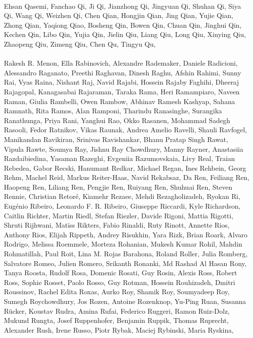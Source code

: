 \paragraph{}Ehsan Qasemi, Fanchao Qi, Ji Qi, Jianzhong Qi, Jingyuan Qi, Shuhan Qi, Siya Qi, Wang Qi, Weizhen Qi, Chen Qian, Hongjin Qian, Jing Qian, Yujie Qian, Zhong Qian, Yaqiong Qiao, Bosheng Qin, Bowen Qin, Chuan Qin, Jinghui Qin, Kechen Qin, Libo Qin, Yujia Qin, Jielin Qiu, Liang Qiu, Long Qiu, Xinying Qiu, Zhaopeng Qiu, Zimeng Qiu, Chen Qu, Tingyu Qu,
\paragraph{}Rakesh R. Menon, Ella Rabinovich, Alexandre Rademaker, Daniele Radicioni, Alessandro Raganato, Preethi Raghavan, Dinesh Raghu, Afshin Rahimi, Sunny Rai, Vyas Raina, Nishant Raj, Navid Rajabi, Hossein Rajaby Faghihi, Dheeraj Rajagopal, Kanagasabai Rajaraman, Taraka Rama, Heri Ramampiaro, Naveen Raman, Giulia Rambelli, Owen Rambow, Abhinav Ramesh Kashyap, Sahana Ramnath, Rita Ramos, Alan Ramponi, Tharindu Ranasinghe, Surangika Ranathunga, Priya Rani, Yanghui Rao, Okko Rasanen, Mohammad Sadegh Rasooli, Fedor Ratnikov, Vikas Raunak, Andrea Amelio Ravelli, Shauli Ravfogel, Manikandan Ravikiran, Srinivas Ravishankar, Bhanu Pratap Singh Rawat, Vipula Rawte, Soumya Ray, Jishnu Ray Chowdhury, Manny Rayner, Anastasiia Razdaibiedina, Yasaman Razeghi, Evgeniia Razumovskaia, Livy Real, Traian Rebedea, Gabor Recski, Hanumant Redkar, Michael Regan, Ines Rehbein, Georg Rehm, Machel Reid, Markus Reiter-Haas, Navid Rekabsaz, Da Ren, Feiliang Ren, Haopeng Ren, Liliang Ren, Pengjie Ren, Ruiyang Ren, Shuhuai Ren, Steven Rennie, Christian Retoré, Kiamehr Rezaee, Mehdi Rezagholizadeh, Ryokan Ri, Eugénio Ribeiro, Leonardo F. R. Ribeiro, Giuseppe Riccardi, Kyle Richardson, Caitlin Richter, Martin Riedl, Stefan Riezler, Davide Rigoni, Mattia Rigotti, Shruti Rijhwani, Matīss Rikters, Fabio Rinaldi, Ruty Rinott, Annette Rios, Anthony Rios, Elijah Rippeth, Andrey Risukhin, Yara Rizk, Brian Roark, Alvaro Rodrigo, Melissa Roemmele, Morteza Rohanian, Mukesh Kumar Rohil, Mahdin Rohmatillah, Paul Roit, Lina M. Rojas Barahona, Roland Roller, Julia Romberg, Salvatore Romeo, Julien Romero, Srikanth Ronanki, Md Rashad Al Hasan Rony, Tanya Roosta, Rudolf Rosa, Domenic Rosati, Guy Rosin, Alexis Ross, Robert Ross, Sophie Rosset, Paolo Rosso, Guy Rotman, Hossein Rouhizadeh, Dmitri Roussinov, Rachel Edita Roxas, Aurko Roy, Shamik Roy, Soumyadeep Roy, Sumegh Roychowdhury, Jos Rozen, Antoine Rozenknop, Yu-Ping Ruan, Susanna Rücker, Koustav Rudra, Amina Rufai, Federico Ruggeri, Ramon Ruiz-Dolz, Mukund Rungta, Josef Ruppenhofer, Benjamin Ruppik, Thomas Ruprecht, Alexander Rush, Irene Russo, Piotr Rybak, Maciej Rybinski, Maria Ryskina,
